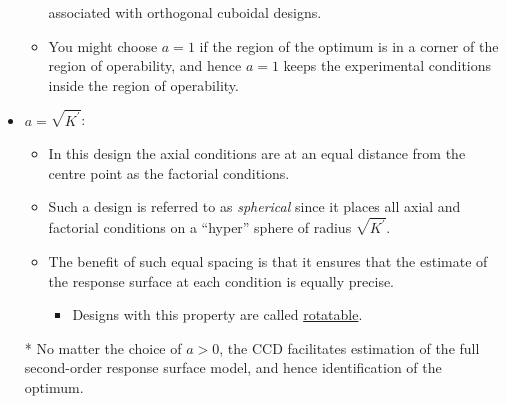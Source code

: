 \begin{itemize}
\begin{itemize}
                    associated with orthogonal cuboidal designs.
              \item You might choose $ a=1 $ if the region of the optimum is in a corner of the region of operability, and hence $ a=1 $ keeps the experimental conditions inside the
                    region of operability.
          \end{itemize}
    \item $ a=\sqrt{K^\prime} $:
          \begin{itemize}
              \item In this design the axial conditions are at an equal distance from the centre point as the factorial
                    conditions.
              \item Such a design is referred to as \emph{spherical} since it places all axial and factorial conditions on a ``hyper'' sphere of radius $ \sqrt{K^\prime} $.
              \item The benefit of such equal spacing is that it ensures that the estimate of the response surface at each condition is equally precise.
                    \begin{itemize}[$\hookrightarrow$]
                        \item Designs with this property are called \underline{rotatable}.
                    \end{itemize}
          \end{itemize}
    \item[*] No matter the choice of $ a>0 $, the CCD facilitates estimation of the full second-order response surface
        model, and hence identification of the optimum.
\end{itemize}
